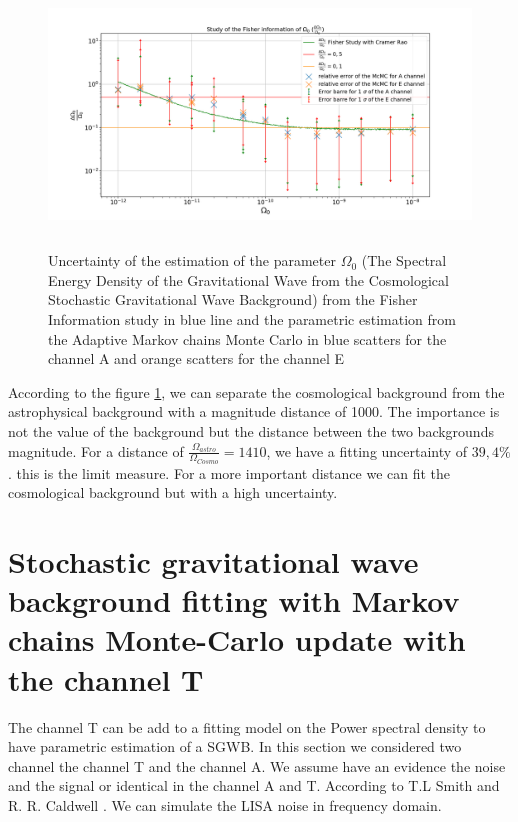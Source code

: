 \documentclass[a4paper,12pt]{article}
\begin{document}
\begin{figure}[H]
    \centering
    \includegraphics[height= 7cm]{Uncertanity.png}
    \caption{Uncertainty of the estimation of the parameter  $\Omega_0$ (The Spectral Energy Density of the Gravitational Wave from the Cosmological Stochastic Gravitational Wave Background) from the Fisher Information study in blue line and the parametric estimation from the Adaptive Markov chains Monte Carlo in blue scatters for the channel A and orange scatters for the channel E  }
    \label{fig:Fisher}
\end{figure}

According to the figure \ref{fig:Fisher}, we can separate the cosmological background from the astrophysical background with a magnitude distance of 1000. The importance is not the value of the background but the distance between the two backgrounds magnitude. For a distance of $ \frac{\Omega_{astro}}{\Omega_{Cosmo}} = 1410$, we have a fitting uncertainty of $39,4\%$. this is the limit measure. For a more important distance we can fit the cosmological background but with a high uncertainty. 


\section{Stochastic gravitational wave background fitting with Markov chains Monte-Carlo update with the channel T} \label{sc:cov}

The channel T can be add to a fitting model on the Power spectral density to have parametric estimation of a SGWB. In this section we considered two channel the channel T and the channel A. We assume have an evidence the noise and the signal or identical in the channel A and T. According to T.L Smith and R. R. Caldwell \cite{PhysRevD.100.104055}. We can simulate the LISA noise in frequency domain.
\end{document}

